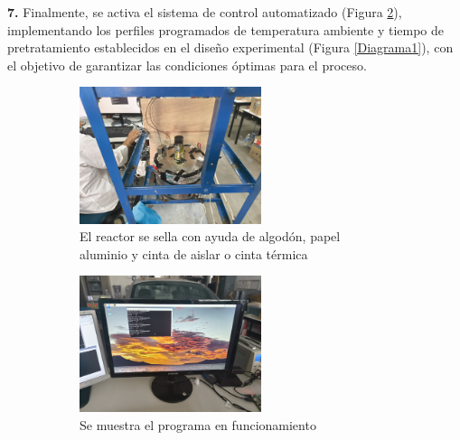 \documentclass[12pt]{article}
\begin{document}
			
			
			\textbf{7.} Finalmente, se activa el sistema de control automatizado (Figura \ref{programa}), implementando los perfiles programados de temperatura ambiente y tiempo de pretratamiento establecidos en el diseño experimental (Figura \ref{Diagrama1}), con el objetivo de garantizar las condiciones óptimas para el proceso.
			
		
			
				\begin{figure}[H]
					\centering
					\begin{subfigure}[t]{0.45\textwidth} %
						\centering
						\includegraphics[width=\linewidth, height=4cm, keepaspectratio]{imagenes/sellado2}
						\caption{El reactor se sella con ayuda de algodón, papel aluminio y cinta de aislar o cinta térmica}
						\label{sellado_bio}
					\end{subfigure}
					\hfill
					\begin{subfigure}[t]{0.45\textwidth}
						\centering
						\includegraphics[width=\linewidth, height=4cm, keepaspectratio]{imagenes/programa3}
						\caption{Se muestra el programa en funcionamiento}
						\label{programa}
					\end{subfigure}
					\caption{}
					\label{fig:fg}
				\end{figure}
			
		
			
		
			
\end{document}

